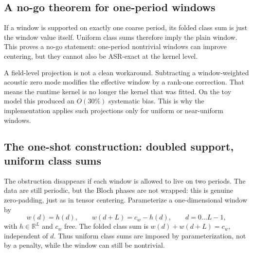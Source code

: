 \documentclass[11pt,a4paper]{article}
\begin{document}
\subsection{A no-go theorem for one-period windows}
\label{sec:nogo}

If a window is supported on exactly one coarse period, its folded class sum
is just the window value itself.  Uniform class sums therefore imply the
plain window.  This proves a no-go statement: one-period nontrivial windows
can improve centering, but they cannot also be ASR-exact at the kernel
level.

A field-level projection is not a clean workaround.  Subtracting a
window-weighted acoustic zero mode modifies the effective window by a
rank-one correction.  That means the runtime kernel is no longer the kernel
that was fitted.  On the toy model this produced an $O(30\%)$ systematic
bias.  This is why the implementation applies such projections only for
uniform or near-uniform windows.

\subsection{The one-shot construction: doubled support, uniform class
sums}
\label{sec:asrdesign}

The obstruction disappears if each window is allowed to live on two
periods.  The data are still periodic, but the Bloch phases are not wrapped:
this is genuine zero-padding, just as in tensor centering.  Parameterize a
one-dimensional window by
\begin{equation}
w(d) = h(d), \qquad w(d+L) = c_w - h(d), \qquad d = 0 \ldots L-1,
\label{eq:manifold}
\end{equation}
with $h \in \mathbb{R}^L$ and $c_w$ free.  The folded class sum is
$w(d)+w(d+L)=c_w$, independent of $d$.  Thus uniform class sums are imposed
by parameterization, not by a penalty, while the window can still be
nontrivial.
\end{document}
